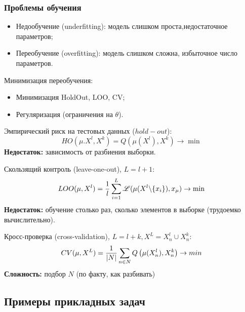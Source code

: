\begin{multicols}{2}
    \subsubsection*{Проблемы обучения}
    \begin{itemize}
      \item Недообучение (underfitting): модель слишком проста,недостаточное параметров;
      \item Переобучение (overfitting): модель слишком сложна, избыточное число параметров.
    \end{itemize}
    Минимизация переобучения:
    \begin{itemize}
      \item Минимизация HoldOut, LOO, CV;
      \item Регуляризация (ограничения на $\theta$).
    \end{itemize}
    Эмпирический риск на тестовых данных ($hold-out$):
    \[
        HO(\mu. X^l, X^k) = Q(\mu(X^l), X^k) \to \min
    \]
    \textbf{Недостаток: } зависимость от разбиения выборки.
    \par
    Скользящий контроль (leave-one-out), $L = l+1$:
    \[
        LOO(\mu, X^l) = \dfrac{1}{l}\sum\limits_{i=1}^{L} \mathscr{L} (\mu(X^l \backslash\{x_i\}), x_{\mu}) \to \min
    \]
    \textbf{Недостаток: } обучение столько раз, сколько элементов в выборке (трудоемко вычислительно).
    \par
    Кросс-проверка (cross-validation), $L = l+k, X^L = X_n^l \cup X_n^k$:
    \[
        CV(\mu, X^L) = \dfrac{1}{|N|} \sum\limits_{n\in N} Q\left(\mu (X^l_n), X^k_n\right) \to min
    \]
    \textbf{Сложность: } подбор $N$ (по факту, как разбивать)
    \subsection*{Примеры прикладных задач}

\end{multicols}
